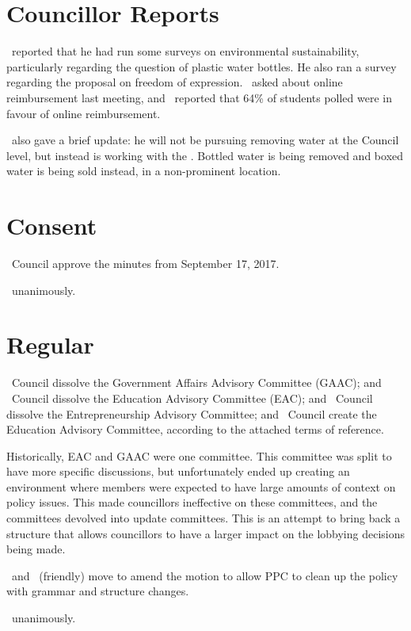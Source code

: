 \section*{Councillor Reports}

\seneca\ reported that he had run some surveys on environmental 
sustainability, particularly regarding the question of plastic water 
bottles. He also ran a survey regarding the proposal on freedom of
expression. \brian\ asked about online reimbursement last meeting,
and \seneca\ reported that 64\% of students polled were in favour of
online reimbursement.

\jason\ also gave a brief update: he will not be pursuing removing water 
at the Council level, but instead is working with the \vpof. Bottled water 
is being removed and boxed water is being sold instead, in a non-prominent 
location. 

\section*{Consent}

\begin{motion}
    \birt\ Council approve the minutes from September 17, 2017.
    \movers{\seneca}{\tristan}

    \carries\ unanimously.
\end{motion}

\section*{Regular}
\begin{motion}
    \birt\ Council dissolve the Government Affairs Advisory Committee (GAAC); and
    \bifrt\ Council dissolve the Education Advisory Committee (EAC); and
    \bifrt\ Council dissolve the Entrepreneurship Advisory Committee; and
    \bifrt\ Council create the Education Advisory Committee, according to the
    attached terms of reference. 
    \movers{\andrewc}{\jason}

    Historically, EAC and GAAC were one committee. This committee was split to
    have more specific discussions, but unfortunately ended up creating an 
    environment where members were expected to have large amounts of context on 
    policy issues. This made councillors ineffective on these committees, and 
    the committees devolved into update committees. This is an attempt to 
    bring back a structure that allows councillors to have a larger impact
    on the lobbying decisions being made.

    \seneca\ and \jason\ (friendly) move to amend the motion to allow PPC to 
    clean up the policy with grammar and structure changes. 

    \carries\ unanimously.
\end{motion}

